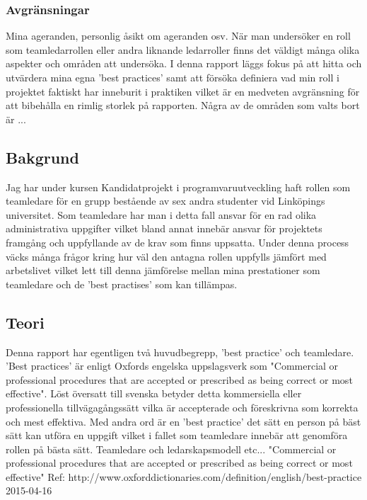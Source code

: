 \subsubsection{Avgränsningar}
Mina ageranden, personlig åsikt om ageranden osv. \newline
När man undersöker en roll som teamledarrollen eller andra liknande ledarroller finns det väldigt många olika aspekter och områden att undersöka. I denna rapport läggs fokus på att hitta och utvärdera mina egna 'best practices' samt att försöka definiera vad min roll i projektet faktiskt har inneburit i praktiken vilket är en medveten avgränsning för att bibehålla en rimlig storlek på rapporten.
\newline \newline
Några av de områden som valts bort är ...

\subsection{Bakgrund}
Jag har under kursen Kandidatprojekt i programvaruutveckling haft rollen som teamledare för en grupp bestående av sex andra studenter vid Linköpings universitet. Som teamledare har man i detta fall ansvar för en rad olika administrativa uppgifter vilket bland annat innebär ansvar för projektets framgång och uppfyllande av de krav som finns uppsatta. 
\newline \newline
Under denna process väcks många frågor kring hur väl den antagna rollen uppfylls jämfört med arbetslivet vilket lett till denna jämförelse mellan mina prestationer som teamledare och de 'best practises' som kan tillämpas.

\subsection{Teori}
Denna rapport har egentligen två huvudbegrepp, 'best practice' och teamledare. 'Best practices' är enligt Oxfords engelska uppslagsverk som "Commercial or professional procedures that are accepted or prescribed as being correct or most effective". Löst översatt till svenska betyder detta kommersiella eller professionella tillvägagångssätt vilka är accepterade och föreskrivna som korrekta och mest effektiva. Med andra ord är en 'best practice' det sätt en person på bäst sätt kan utföra en uppgift vilket i fallet som teamledare innebär att genomföra rollen på bästa sätt. 
\newline \newline
Teamledare och ledarskapsmodell etc...
"Commercial or professional procedures that are accepted or prescribed as being correct or most effective"
\newline \newline
Ref: http://www.oxforddictionaries.com/definition/english/best-practice 2015-04-16

